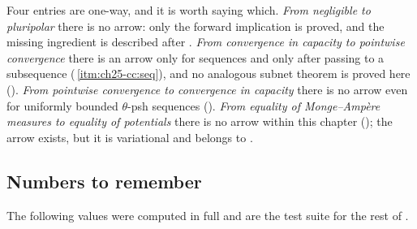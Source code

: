 Four entries are one-way, and it is worth saying which.  \emph{From
negligible to pluripolar} there is no arrow: only the forward implication is
proved, and the missing ingredient is described after
.  \emph{From convergence in capacity to
pointwise convergence} there is an arrow only for sequences and only after
passing to a subsequence
(\,\cref{itm:ch25-cc:seq}), and no analogous subnet theorem is proved here
().  \emph{From pointwise
convergence to convergence in capacity} there is no arrow even for uniformly
bounded $\theta$-psh sequences
().  \emph{From equality of
Monge--Amp\`ere measures to equality of potentials} there is no arrow within
this chapter (); the arrow exists, but it is
variational and belongs to
.

\subsection{Numbers to remember}
\label{sec:ch25-dict-numbers}

The following values were computed in full and are the test suite for the
rest of .

